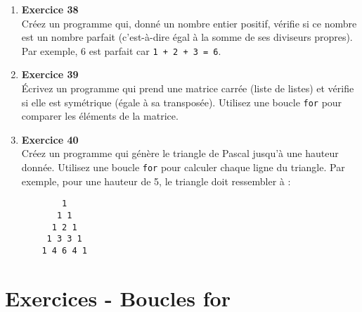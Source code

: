 \documentclass{article}
\begin{document}
\begin{enumerate}
    \item \textbf{Exercice 38} \\
    Créez un programme qui, donné un nombre entier positif, vérifie si ce nombre est un nombre parfait (c'est-à-dire égal à la somme de ses diviseurs propres). Par exemple, 6 est parfait car \texttt{1 + 2 + 3 = 6}.

    \item \textbf{Exercice 39} \\
    Écrivez un programme qui prend une matrice carrée (liste de listes) et vérifie si elle est symétrique (égale à sa transposée). Utilisez une boucle \texttt{for} pour comparer les éléments de la matrice.

    \item \textbf{Exercice 40} \\
    Créez un programme qui génère le triangle de Pascal jusqu'à une hauteur donnée. Utilisez une boucle \texttt{for} pour calculer chaque ligne du triangle. Par exemple, pour une hauteur de 5, le triangle doit ressembler à :
    \begin{verbatim}
        1
       1 1
      1 2 1
     1 3 3 1
    1 4 6 4 1
    \end{verbatim}

\end{enumerate}


\section*{Exercices - Boucles for}
\end{document}
